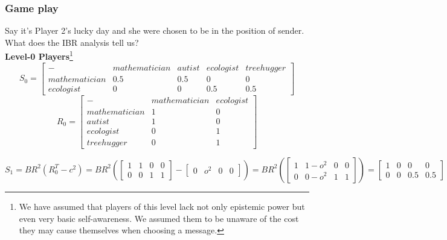 \documentclass[10]{article}
\begin{document}
\subsubsection{Game play}
Say it's Player 2's lucky day and she were chosen to be in the position of sender.  What does the IBR analysis tell us?\\
\textbf{Level-0 Players}\footnote{We have assumed that players of this level lack not only epistemic power but even very basic self-awareness. We assumed them to be unaware of the cost they may cause themselves when choosing a message.}\\
\begin{equation*}
S_0=
\begin{bmatrix}
- & mathematician & autist & ecologist & treehugger \\
mathematician  & 0.5      & 0.5    & 0        & 0   \\
ecologist  & 0     & 0   & 0.5      & 0.5 
\end{bmatrix}
\end{equation*}
\begin{equation*}
R_0=
\begin{bmatrix}
- & mathematician & ecologist\\
mathematician  & 1      & 0 \\
autist  & 1     & 0   \\
ecologist & 0 & 1 \\
treehugger & 0 & 1
\end{bmatrix}
\end{equation*}

\begin{equation*}
S_1=
BR^2(R_0^T-c^2)=
BR^2(
\begin{bmatrix}
1 & 1 & 0 & 0\\
0 & 0 & 1 & 1
\end{bmatrix}
-
\begin{bmatrix}
0 & o^2 & 0 & 0
\end{bmatrix}
)
=
BR^2(
\begin{bmatrix}
 1      & 1-o^2   & 0  & 0   \\
0     & 0-o^2   & 1      & 1 
\end{bmatrix}
)
=
\begin{bmatrix}
1 & 0 & 0 & 0\\
0 & 0 & 0.5 & 0.5
\end{bmatrix}
\end{equation*}
\end{document}
